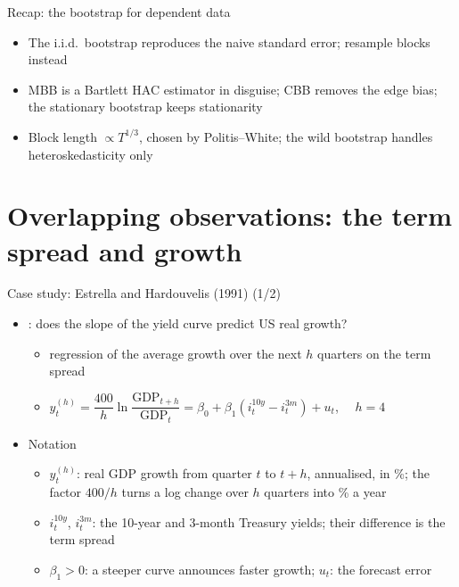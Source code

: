 \begin{frame}{Recap: the bootstrap for dependent data}
\itemsize{\small}
\begin{itemize}
    \item The i.i.d.\ bootstrap reproduces the naive standard error; resample blocks instead
    \item MBB  is a Bartlett HAC estimator in disguise; CBB removes the edge bias; the stationary bootstrap keeps stationarity
    \item Block length $\propto T^{1/3}$, chosen by Politis--White; the wild bootstrap handles heteroskedasticity only
\end{itemize}
\end{frame}


\section{Overlapping observations: the term spread and growth}

\begin{frame}{Case study: Estrella and Hardouvelis (1991) (1/2)}
\itemsize{\small}
\begin{itemize}
    \item {}: does the slope of the yield curve predict US real growth?
    \begin{itemize}
        \item regression of the average growth over the next $h$ quarters on the term spread
        \item $y_t^{(h)} = \dfrac{400}{h}\ln\dfrac{\mathrm{GDP}_{t+h}}{\mathrm{GDP}_t} = \beta_0 + \beta_1 (i^{10y}_t - i^{3m}_t) + u_t$, $\quad h = 4$
    \end{itemize}
    \item Notation
    \begin{itemize}
        \item $y_t^{(h)}$: real GDP growth from quarter $t$ to $t + h$, annualised, in \%; the factor $400/h$ turns a log change over $h$ quarters into \% a year
        \item $i^{10y}_t$, $i^{3m}_t$: the 10-year and 3-month Treasury yields; their difference is the term spread
        \item $\beta_1 > 0$: a steeper curve announces faster growth; $u_t$: the forecast error
    \end{itemize}
\end{itemize}
\end{frame}

